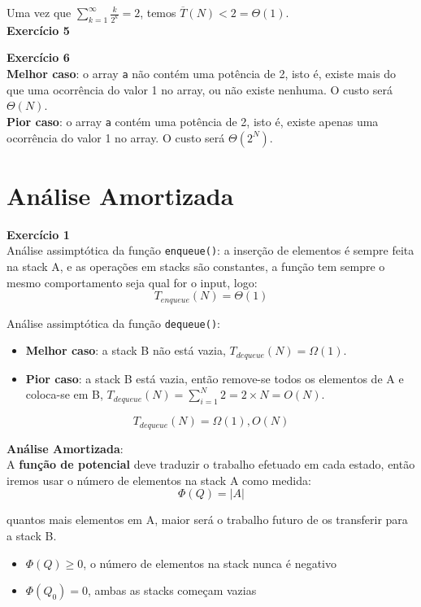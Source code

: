 \documentclass[a4paper,11pt]{article}
\begin{document}
	\noindent Uma vez que $ \sum_{k=1}^{\infty} \frac{k}{2^k} = 2 $, temos $ \overline{T}(N) < 2 = \Theta(1) $.\\
	
	\noindent \textbf{Exercício 5}
	
	\noindent \textbf{Exercício 6}\\
	
	\noindent \textbf{Melhor caso}: o array \texttt{a} não contém uma potência de 2, isto é, existe mais do que uma ocorrência do valor 1 no array, ou não existe nenhuma. O custo será $\Theta(N)$.\\
	
	\noindent \textbf{Pior caso}: o array \texttt{a} contém uma potência de 2, isto é, existe apenas uma ocorrência do valor 1 no array. O custo será $\Theta(2^N)$.\\
	
	\section{Análise Amortizada}
	
	\noindent \textbf{Exercício 1}\\
	
	\noindent Análise assimptótica da função \texttt{enqueue()}: a inserção de elementos é sempre feita na stack A, e as operações em stacks são constantes, a função tem sempre o mesmo comportamento seja qual for o input, logo:
	\[
		T_{enqueue}(N) = \Theta(1)
	\]
	
	\noindent Análise assimptótica da função \texttt{dequeue()}:
	\begin{itemize}
		\item \textbf{Melhor caso}: a stack B não está vazia, $ T_{dequeue}(N) = \Omega(1) $.
		\item \textbf{Pior caso}: a stack B está vazia, então remove-se todos os elementos de A e coloca-se em B, $ T_{dequeue}(N) = \sum_{i=1}^{N} 2 = 2 \times N = O(N) $.
	\end{itemize}
	\[
		T_{dequeue}(N) = \Omega(1), O(N)
	\]
	
	\noindent \textbf{Análise Amortizada}:\\
	
	\noindent A \textbf{função de potencial} deve traduzir o trabalho efetuado em cada estado, então iremos usar o número de elementos na stack A como medida:
	\[
		\Phi(Q) = |A|
	\]
	
	\noindent quantos mais elementos em A, maior será o trabalho futuro de os transferir para a stack B.
	\begin{itemize}
		\item $\Phi(Q) \geq 0$, o número de elementos na stack nunca é negativo
		\item $\Phi(Q_0) = 0$, ambas as stacks começam vazias
	\end{itemize}
	
\end{document}
